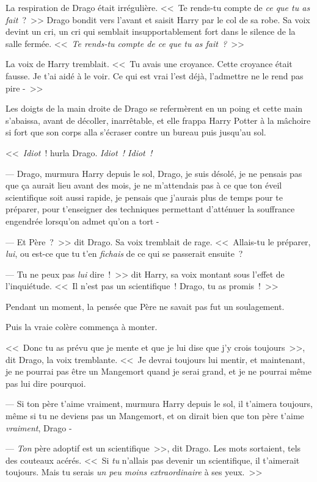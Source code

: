 La respiration de Drago était irrégulière. <<~Te rends-tu compte de \emph{ce que tu as fait}~?~>> Drago bondit vers l'avant et saisit Harry par le col de sa robe. Sa voix devint un cri, un cri qui semblait insupportablement fort dans le silence de la salle fermée. <<~\emph{Te rends-tu compte de ce que tu as fait~?}~>>

La voix de Harry tremblait. <<~Tu avais une croyance. Cette croyance était fausse. Je t'ai aidé à le voir. Ce qui est vrai l'est déjà, l'admettre ne le rend pas pire -~>>

Les doigts de la main droite de Drago se refermèrent en un poing et cette main s'abaissa, avant de décoller, inarrêtable, et elle frappa Harry Potter à la mâchoire si fort que son corps alla s'écraser contre un bureau puis jusqu'au sol.

<<~\emph{Idiot}~! hurla Drago. \emph{Idiot~! Idiot~!}

--- Drago, murmura Harry depuis le sol, Drago, je suis désolé, je ne pensais pas que ça aurait lieu avant des mois, je ne m'attendais pas à ce que ton éveil scientifique soit aussi rapide, je pensais que j'aurais plus de temps pour te préparer, pour t'enseigner des techniques permettant d'atténuer la souffrance engendrée lorsqu'on admet qu'on a tort -

--- Et Père~?~>> dit Drago. Sa voix tremblait de rage. <<~Allais-tu le préparer, \emph{lui}, ou est-ce que tu t'en \emph{fichais} de ce qui se passerait ensuite~?

--- Tu ne peux pas \emph{lui} dire~!~>> dit Harry, sa voix montant sous l'effet de l'inquiétude. <<~Il n'est pas un scientifique~! Drago, tu as promis~!~>>

Pendant un moment, la pensée que Père ne savait pas fut un soulagement.

Puis la vraie colère commença à monter.

<<~Donc tu as prévu que je mente et que je lui dise que j'y crois toujours~>>, dit Drago, la voix tremblante. <<~Je devrai toujours lui mentir, et maintenant, je ne pourrai pas être un Mangemort quand je serai grand, et je ne pourrai même pas lui dire pourquoi.

--- Si ton père t'aime vraiment, murmura Harry depuis le sol, il t'aimera toujours, même si tu ne deviens pas un Mangemort, et on dirait bien que ton père t'aime \emph{vraiment}, Drago -

--- \emph{Ton} père adoptif est un scientifique~>>, dit Drago. Les mots sortaient, tels des couteaux acérés. <<~Si \emph{tu} n'allais pas devenir un scientifique, il t'aimerait toujours. Mais tu serais \emph{un peu moins extraordinaire} à ses yeux.~>>

